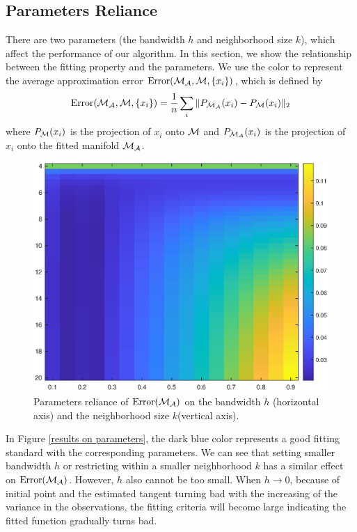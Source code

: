 \documentclass[aos,preprint]{imsart}
\theoremstyle{remark}
\begin{document}
\subsection{Parameters Reliance}
There are two parameters (the bandwidth $h$ and neighborhood size $k$), which affect the performance of our algorithm. In this section, we show the relationship between the fitting property and the parameters.  We use the color to represent the average approximation error ${\rm Error}({\cal M}_{\cal A},{\cal M},\{x_i\})$, which is defined by
\[
{\rm Error}({\cal M}_{\cal A},{\cal M},\{x_i\}) = \frac{1}{n}\sum_i \|P_{{\cal M}_{\cal A}}(x_i) -P_{{\cal M}} (x_i)\|_2
\]
where $P_{{\cal M}} (x_i)$ is the projection of $x_i$ onto $\cal M$ and $P_{{\cal M}_{\cal A}}(x_i) $ is the projection of $x_i$ onto the fitted manifold ${\cal M}_{\cal A}$.
\begin{figure}[h] %
   \centering
   \includegraphics[width=0.6\linewidth]{parameter_rh.eps} 
   \caption{Parameters reliance of ${\rm Error({\cal M}_{\cal A})}$ on the bandwidth $h$ (horizontal axis) and the neighborhood size $k$(vertical axis).}
   \label{results on parameters}
\end{figure}

In Figure \eqref{results on parameters}, the dark blue color represents a good fitting standard with the corresponding parameters. We can see that setting smaller bandwidth $h$ or restricting within a smaller neighborhood $k$ has a similar effect on ${\rm Error({\cal M}_{\cal A})}$. However, $h$ also cannot be too small. When $h\rightarrow 0$, because of initial point and the estimated tangent turning bad with the increasing of the variance in the observations, the fitting criteria will become large indicating the fitted function gradually turns bad.
\end{document}
